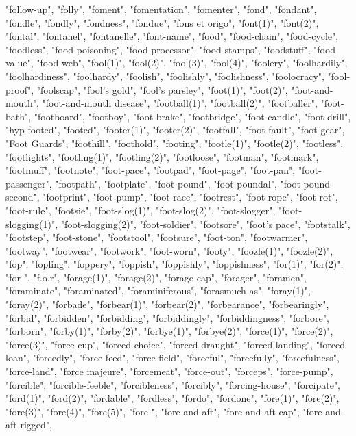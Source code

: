 "follow-up",
"folly",
"foment",
"fomentation",
"fomenter",
"fond",
"fondant",
"fondle",
"fondly",
"fondness",
"fondue",
"fons et origo",
"font(1)",
"font(2)",
"fontal",
"fontanel",
"fontanelle",
"font-name",
"food",
"food-chain",
"food-cycle",
"foodless",
"food poisoning",
"food processor",
"food stamps",
"foodstuff",
"food value",
"food-web",
"fool(1)",
"fool(2)",
"fool(3)",
"fool(4)",
"foolery",
"foolhardily",
"foolhardiness",
"foolhardy",
"foolish",
"foolishly",
"foolishness",
"foolocracy",
"fool-proof",
"foolscap",
"fool's gold",
"fool's parsley",
"foot(1)",
"foot(2)",
"foot-and-mouth",
"foot-and-mouth disease",
"football(1)",
"football(2)",
"footballer",
"foot-bath",
"footboard",
"footboy",
"foot-brake",
"footbridge",
"foot-candle",
"foot-drill",
"hyp-footed",
"footed",
"footer(1)",
"footer(2)",
"footfall",
"foot-fault",
"foot-gear",
"Foot Guards",
"foothill",
"foothold",
"footing",
"footle(1)",
"footle(2)",
"footless",
"footlights",
"footling(1)",
"footling(2)",
"footloose",
"footman",
"footmark",
"footmuff",
"footnote",
"foot-pace",
"footpad",
"foot-page",
"foot-pan",
"foot-passenger",
"footpath",
"footplate",
"foot-pound",
"foot-poundal",
"foot-pound-second",
"footprint",
"foot-pump",
"foot-race",
"footrest",
"foot-rope",
"foot-rot",
"foot-rule",
"footsie",
"foot-slog(1)",
"foot-slog(2)",
"foot-slogger",
"foot-slogging(1)",
"foot-slogging(2)",
"foot-soldier",
"footsore",
"foot's pace",
"footstalk",
"footstep",
"foot-stone",
"footstool",
"footsure",
"foot-ton",
"footwarmer",
"footway",
"footwear",
"footwork",
"foot-worn",
"footy",
"foozle(1)",
"foozle(2)",
"fop",
"fopling",
"foppery",
"foppish",
"foppishly",
"foppishness",
"for(1)",
"for(2)",
"for-",
"f.o.r",
"forage(1)",
"forage(2)",
"forage cap",
"forager",
"foramen",
"foraminate",
"foraminated",
"foraminiferous",
"forasmuch as",
"foray(1)",
"foray(2)",
"forbade",
"forbear(1)",
"forbear(2)",
"forbearance",
"forbearingly",
"forbid",
"forbidden",
"forbidding",
"forbiddingly",
"forbiddingness",
"forbore",
"forborn",
"forby(1)",
"forby(2)",
"forbye(1)",
"forbye(2)",
"force(1)",
"force(2)",
"force(3)",
"force cup",
"forced-choice",
"forced draught",
"forced landing",
"forced loan",
"forcedly",
"force-feed",
"force field",
"forceful",
"forcefully",
"forcefulness",
"force-land",
"force majeure",
"forcemeat",
"force-out",
"forceps",
"force-pump",
"forcible",
"forcible-feeble",
"forcibleness",
"forcibly",
"forcing-house",
"forcipate",
"ford(1)",
"ford(2)",
"fordable",
"fordless",
"fordo",
"fordone",
"fore(1)",
"fore(2)",
"fore(3)",
"fore(4)",
"fore(5)",
"fore-",
"fore and aft",
"fore-and-aft cap",
"fore-and-aft rigged",
